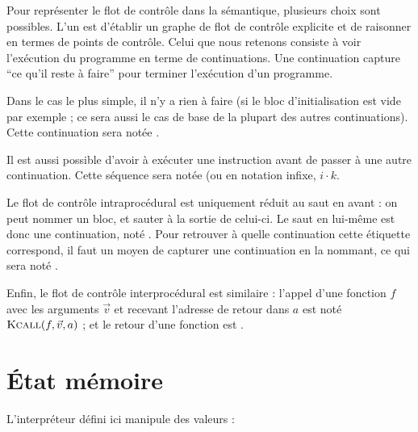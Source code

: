 Pour représenter le flot de contrôle dans la sémantique, plusieurs choix sont
possibles. L'un est d'établir un graphe de flot de contrôle explicite et de
raisonner en termes de points de contrôle. Celui que nous retenons consiste à
voir l'exécution du programme en terme de continuations. Une continuation
capture ``ce qu'il reste à faire'' pour terminer l'exécution d'un programme.

Dans le cas le plus simple, il n'y a rien à faire (si le bloc d'initialisation
est vide par exemple ; ce sera aussi le cas de base de la plupart des autres
continuations). Cette continuation sera notée \kPass.

Il est aussi possible d'avoir à exécuter une instruction avant de passer à une
autre continuation. Cette séquence sera notée  (ou en notation
infixe, $i \cdot k$.

Le flot de contrôle intraprocédural est uniquement réduit au saut en avant : on
peut nommer un bloc, et sauter à la sortie de celui-ci. Le saut en lui-même est
donc une continuation, noté . Pour retrouver à quelle continuation
cette étiquette correspond, il faut un moyen de capturer une continuation en la
nommant, ce qui sera noté .

Enfin, le flot de contrôle interprocédural est similaire : l'appel d'une
fonction $f$ avec les arguments $\vec{v}$ et recevant l'adresse de retour dans
$a$ est noté $\textsc{Kcall}(f, \vec{v}, a)$ ; et le retour d'une fonction est .


\section{État mémoire}
\label{sec:sigma}

L'interpréteur défini ici manipule des valeurs :

